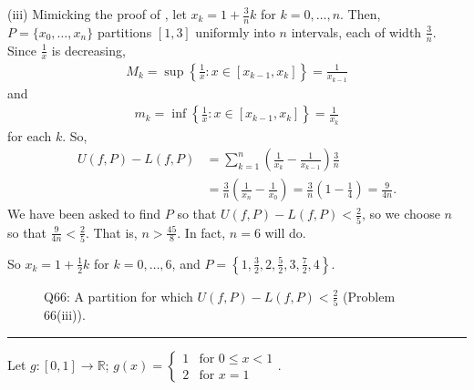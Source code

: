 \documentclass[letterpaper,10pt,english]{jupyterBook}
\let\sphinxpxdimen\pdfpxdimen\else\newdimen\sphinxpxdimen
\begin{document}
\sphinxAtStartPar
(iii) Mimicking the proof of , let \(x_k=1+\frac{3}{n}k\) for \(k=0,\ldots,n\). Then, \(P=\{x_0,\ldots,x_n\}\) partitions \([1,3]\) uniformly into \(n\) intervals, each of width \(\frac{3}{n}\). Since \(\frac{1}{x}\) is decreasing,
\begin{equation*}
\begin{split}
M_k = \sup\left\{\frac{1}{x}:x\in[x_{k-1},x_k]\right\} =\frac{1}{x_{k-1}}
\end{split}
\end{equation*}
\sphinxAtStartPar
and
\begin{equation*}
\begin{split}
m_k = \inf\left\{\frac{1}{x}:x\in[x_{k-1},x_k]\right\} =\frac{1}{x_k}
\end{split}
\end{equation*}
\sphinxAtStartPar
for each \(k\). So,
\begin{align*}
U(f,P) - L(f,P) &= \sum_{k=1}^n\left(\frac{1}{x_k} - \frac{1}{x_{k-1}}\right)\frac{3}{n} \\
&= \frac{3}{n}\left(\frac{1}{x_n}-\frac{1}{x_0}\right) = \frac{3}{n}\left(1-\frac{1}{4}\right) = \frac{9}{4n}.
\end{align*}
\sphinxAtStartPar
We have been asked to find \(P\) so that \(U(f,P)-L(f,P)<\frac{2}{5}\), so we choose \(n\) so that \(\frac{9}{4n}<\frac{2}{5}\). That is, \(n>\frac{45}{8}\). In fact, \(n=6\) will do.

\sphinxAtStartPar
So \(x_k=1+\frac{1}{2}k\) for \(k=0,\ldots,6\), and \(P=\left\{1,\frac{3}{2},2,\frac{5}{2},3,\frac{7}{2},4\right\}\).

\begin{figure}[htbp]
\centering
\capstart

\noindent\sphinxincludegraphics[width=500\sphinxpxdimen]{{int1iii}.png}
\caption{Q66: A partition for which \(U(f,P)-L(f,P)<\frac{2}{5}\) (Problem 66(iii)).}\label{\detokenize{Solutions-full:q64iii}}\end{figure}


\bigskip\hrule\bigskip


\sphinxAtStartPar
{\hyperref[\detokenize{Problems:id67}]{}} Let \(g:[0,1]\to\mathbb{R}\); \(\displaystyle g(x)=\left\{\begin{array}{cc} 1 & \text{for } 0\leq x<1 \\ 2 &\text{for } x=1 \end{array}\right.\).
\end{document}
